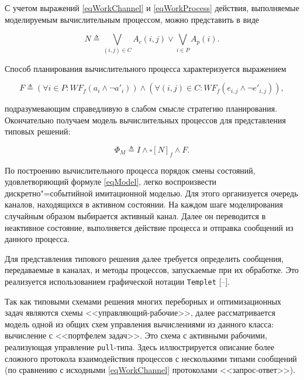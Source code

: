 С учетом выражений \eqref{eqWorkChannel} и \eqref{eqWorkProcess} действия, выполняемые моделируемым вычислительным процессом, можно представить в виде

$$

N\triangleq\bigvee_{\left(i,j\right)\in C}A_{c}\left(i,j\right)\vee\bigvee_{i\in P}A_{p}\left(i\right).


$$



Способ планирования вычислительного процесса характеризуется выражением

$$

F\triangleq\left(\forall i\in P:WF_{f}\left(a_{i}\wedge\neg a'_{i}\right)\right)\wedge\left(\forall\left(i,j\right)\in C:WF_{f}\left(e_{i,j}\wedge\neg e'_{i,j}\right)\right),


$$

подразумевающим справедливую в слабом смысле стратегию планирования. Окончательно получаем модель вычислительных процессов для представления типовых решений:

\begin{equation}

\mathit{\Phi}_{M}\triangleq I\wedge\square\left[N\right]_f\wedge F.

\label{eqModel}

\end{equation}



По построению вычислительного процесса порядок смены состояний, удовлетворяющий формуле \eqref{eqModel}, легко воспроизвести дискретно"=событийной имитационной моделью. Для этого организуется очередь каналов, находящихся в активном состоянии. На каждом шаге моделирования случайным образом выбирается активный канал. Далее он переводится в неактивное состояние, выполняется действие процесса и отправка сообщений из данного процесса.



Для представления типового решения далее требуется определить сообщения, передаваемые в каналах, и методы процессов, запускаемые при их обработке. Это реализуется использованием графической нотации {\tt Templet} [--]. 

Так как типовыми схемами решения многих переборных и оптимизационных задач являются схемы <<управляющий-рабочие>>, далее рассматривается модель одной из общих схем управления вычислениями из данного класса: вычисление с <<портфелем задач>>. Это схема с активными рабочими, реализующая управление {\tt pull}-типа. Здесь иллюстрируется описание более сложного протокола взаимодействия процессов с несколькими типами сообщений (по сравнению с исходными \eqref{eqWorkChannel} протоколами <<запрос-ответ>>). 




